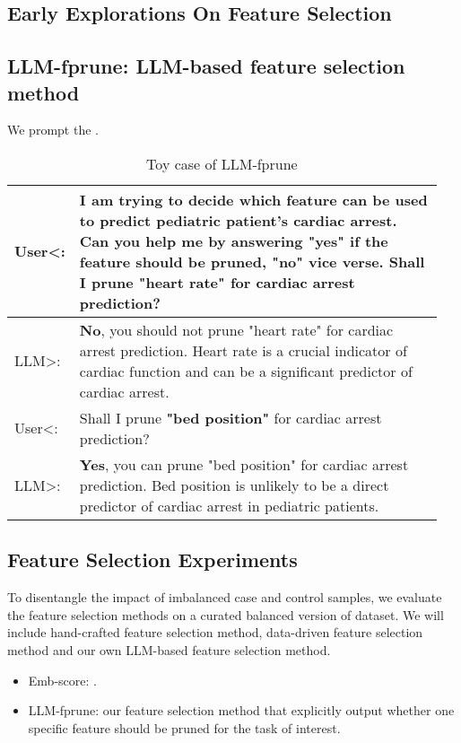 \clearpage
\begin{appendices}
\section{Early Explorations On Feature Selection}
\subsection{LLM-fprune: LLM-based feature selection method}
We prompt the . 

\begin{table}[ht!]
    \caption{Toy case of LLM-fprune}
    \label{tab:toy_case_fprune}
    \centering
    \begin{tabular}{p{0.10\linewidth} | p{0.85\linewidth}}
    \toprule
    User\textless:& I am trying to decide which feature can be used to predict pediatric patient's cardiac arrest. Can you help me by answering "yes" if the feature should be pruned, "no" vice verse. \newline Shall I prune \textbf{"heart rate"} for cardiac arrest prediction? \\ \hline
    LLM\textgreater:& \textbf{No}, you should not prune "heart rate" for cardiac arrest prediction. Heart rate is a crucial indicator of cardiac function and can be a significant predictor of cardiac arrest.\\
    \midrule
    User\textless:& Shall I prune \textbf{"bed position"} for cardiac arrest prediction?\\ \hline
    LLM\textgreater:& \textbf{Yes}, you can prune "bed position" for cardiac arrest prediction. Bed position is unlikely to be a direct predictor of cardiac arrest in pediatric patients.\\
    \bottomrule
    \end{tabular}
\end{table}


\subsection{Feature Selection Experiments}
To disentangle the impact of imbalanced case and control samples, we evaluate the feature selection methods on a curated balanced version of dataset. We will include hand-crafted feature selection method, data-driven feature selection method and our own LLM-based feature selection method.
\begin{itemize}
    \item Emb-score: .
    \item LLM-fprune: our feature selection method that explicitly output whether one specific feature should be pruned for the task of interest.
\end{itemize}


\end{appendices}
